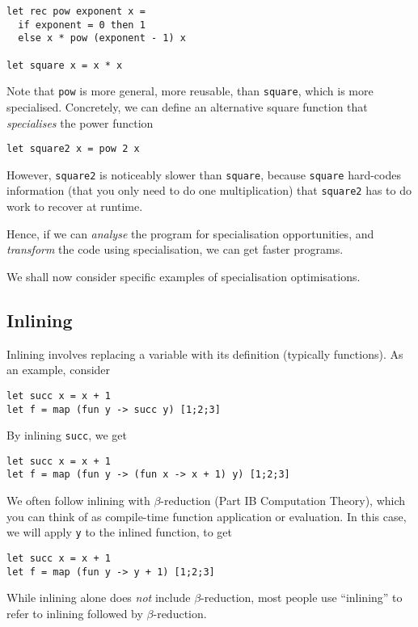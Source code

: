 \begin{verbatim}
let rec pow exponent x = 
  if exponent = 0 then 1
  else x * pow (exponent - 1) x

let square x = x * x
\end{verbatim}

Note that \texttt{pow} is more general, more reusable, than \texttt{square}, which is more specialised. Concretely, we can define an alternative square function that \textit{specialises} the power function

\begin{verbatim}
let square2 x = pow 2 x
\end{verbatim}

However, \texttt{square2} is noticeably slower than \texttt{square}, because \texttt{square} hard-codes information (that you only need to do one multiplication) that \texttt{square2} has to do work to recover at runtime. 

Hence, if we can \textit{analyse} the program for specialisation opportunities, and \textit{transform} the code using specialisation, we can get faster programs.

We shall now consider specific examples of specialisation optimisations.

\subsection{Inlining}
Inlining involves replacing a variable with its definition (typically functions). As an example, consider 

\begin{verbatim}
let succ x = x + 1
let f = map (fun y -> succ y) [1;2;3]
\end{verbatim}

By inlining \texttt{succ}, we get
\begin{verbatim}
let succ x = x + 1
let f = map (fun y -> (fun x -> x + 1) y) [1;2;3]
\end{verbatim}
We often follow inlining with $\beta$-reduction (\textsf{Part IB Computation Theory}), which you can think of as compile-time function application or evaluation. In this case, we will apply \texttt{y} to the inlined function, to get 
\begin{verbatim}
let succ x = x + 1
let f = map (fun y -> y + 1) [1;2;3]
\end{verbatim}
While inlining alone does \textit{not} include $\beta$-reduction, most people use ``inlining'' to refer to inlining followed by $\beta$-reduction. 

